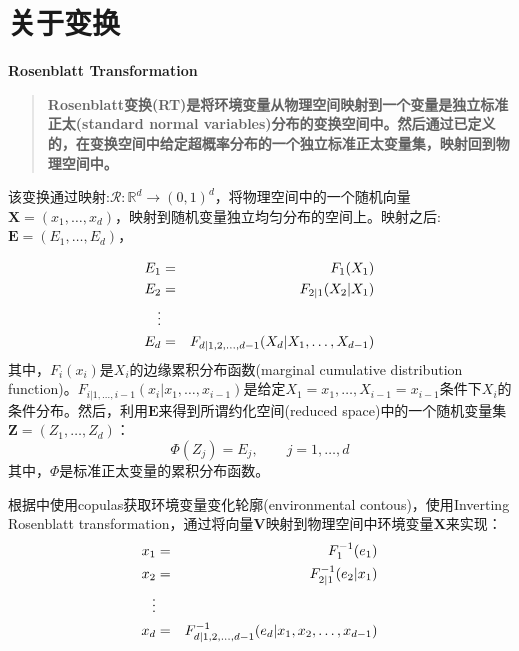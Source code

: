 \section{关于变换}
\textbf{\textcolor[rgb]{1,0,0}{Rosenblatt Transformation}}
\begin{quotation}
    \textbf{\textcolor[rgb]{1,0,0}{Rosenblatt变换(RT)是将环境变量从物理空间映射到一个变量是独立标准正太(standard normal variables)分布的变换空间中。然后通过已定义的，在变换空间中给定超概率分布的一个独立标准正太变量集，映射回到物理空间中。}}\cite{Montes2015}
\end{quotation}


该变换通过映射:$\mathcal{R}: \mathbb{R}^d \rightarrow (0,1)^d$，将物理空间中的一个随机向量$\mathbf{X}=(x_1,\dots,x_d)$，映射到随机变量独立均匀分布的空间上。映射之后:$\mathbf{E} = (E_1,\dots,E_d)$\cite{Montes2015}，

\begin{eqnarray}
    E_1 &=& F_1(X_1)  \notag \\
    E_2 &=& F_{2|1}(X_2|X_1) \notag \\
    \vdots \\
    E_d &=& F_{d|1,2,\dots,d-1} (X_d | X_1,\dots,X_{d-1}) \notag
    \label{eq-rosenblatt}
\end{eqnarray}
其中，$F_i(x_i)$是$X_i$的\textcolor[rgb]{1,0,0}{边缘累积分布函数(marginal cumulative distribution function)}。$F_{i|1,\dots,i-1}(x_i|x_1,\dots,x_{i-1})$是给定$X_1 = x_1,\dots,X_{i-1}=x_{i-1}$条件下$X_i$的条件分布。然后，利用$\mathbf{E}$来得到所谓\textcolor[rgb]{1,0,0}{约化空间(reduced space)}中的一个随机变量集$\mathbf{Z} = (Z_1,\dots,Z_d)$：
\begin{equation}
    \Phi (Z_j) = E_j, \qquad j=1,\dots,d
    \label{eq-cdf}
\end{equation}
其中，$\Phi$是标准正太变量的累积分布函数。

根据\cite{Montes2015}中使用copulas获取环境变量变化轮廓(environmental contous)，使用\textcolor[rgb]{1,0,0}{Inverting Rosenblatt transformation}，通过将向量$\mathbf{V}$映射到物理空间中环境变量$\mathbf{X}$来实现：
\begin{eqnarray}
    \label{eq-invervse-rosenblatt}
    x_1 &=& F_1^{-1}(e_1)  \notag \\
    x_2 &=& F_{2|1}^{-1}(e_2|x_1) \notag \\
    \vdots \\
    x_d &=& F_{d|1,2,\dots,d-1}^{-1} (e_d | x_1,x_2,\dots,x_{d-1}) \notag
\end{eqnarray}

